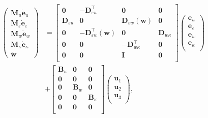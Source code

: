 \documentclass{ifacconf}
\begin{document}
\begin{equation}\label{eq:findimSys}
	\begin{aligned}
		\begin{pmatrix}
			\mathbf{M}_u \dot{\mathbf{e}}_u \\
			\mathbf{M}_\varepsilon \dot{\mathbf{e}}_\varepsilon \\
			\mathbf{M}_w \dot{\mathbf{e}}_w \\
			\mathbf{M}_\kappa \dot{\mathbf{e}}_\kappa \\
			\dot{\mathbf{w}}
		\end{pmatrix} &= 
		\begin{bmatrix}
			\mathbf{0} & -\mathbf{D}_{\varepsilon u}^\top & \mathbf{0} & \mathbf{0}  \\
			\mathbf{D}_{\varepsilon u} & \mathbf{0} & \mathbf{D}_{\varepsilon w}(\mathbf{w}) & \mathbf{0}  \\
			\mathbf{0} & -\mathbf{D}_{\varepsilon w}^\top(\mathbf{w}) & \mathbf{0} & \mathbf{D}_{w \kappa} \\
			\mathbf{0} & \mathbf{0} & -\mathbf{D}_{w \kappa}^\top & \mathbf{0}  \\
			\mathbf{0} & \mathbf{0} & \mathbf{I} & \mathbf{0} \\ 
		\end{bmatrix}
		\begin{pmatrix}
			\mathbf{e}_u \\
			\mathbf{e}_\varepsilon \\
			\mathbf{e}_w \\
			\mathbf{e}_\kappa \\
		\end{pmatrix} \\
	&+ \begin{bmatrix}
		\mathbf{B}_u & \mathbf{0} & \mathbf{0} \\
		\mathbf{0} & \mathbf{0} & \mathbf{0}\\
		\mathbf{0} & \mathbf{B}_w & \mathbf{0} \\
		\mathbf{0} & \mathbf{0} & \mathbf{B}_{\kappa}\\
		\mathbf{0} & \mathbf{0} & \mathbf{0}\\
	\end{bmatrix}
		\begin{pmatrix}
		\mathbf{u}_{1} \\
		\mathbf{u}_2 \\
		\mathbf{u}_3 \\
		\end{pmatrix}, \\

\end{aligned}
\end{equation}
\end{document}
